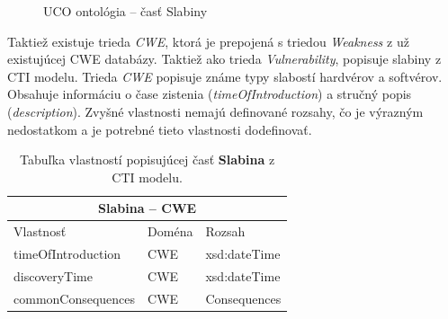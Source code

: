 \documentclass[12pt, a4paper, oneside]{book}
\begin{document}
\begin{figure}
\label{fig:semantic_web}
\caption{UCO ontológia -- časť Slabiny}
\end{figure}

Taktiež existuje trieda \textit{CWE}, ktorá je prepojená s triedou \textit{Weakness} z už existujúcej CWE databázy. Taktiež ako trieda \textit{Vulnerability}, popisuje slabiny z CTI modelu. Trieda \textit{CWE} popisuje známe typy slabostí hardvérov a softvérov. Obsahuje informáciu o čase zistenia (\textit{timeOfIntroduction}) a stručný popis (\textit{description}). Zvyšné vlastnosti nemajú definované rozsahy, čo je výrazným nedostatkom a je potrebné tieto vlastnosti dodefinovať.
\begin{table}[hbt!]
\centering
\begin{tabular}{ |p{5cm}||p{3cm}|p{3cm}|  }
 \hline
 \multicolumn{3}{|c|}{Slabina -- CWE} \\
 \hline
 Vlastnosť & Doména & Rozsah\\
 \hline
 timeOfIntroduction & CWE & xsd:dateTime\\
 discoveryTime & CWE & xsd:dateTime\\
 commonConsequences & CWE & Consequences\\
 \hline
\end{tabular}
\caption{Tabuľka vlastností popisujúcej časť \textbf{Slabina} z CTI modelu.}
\label{tab:template}
\end{table}
\end{document}
